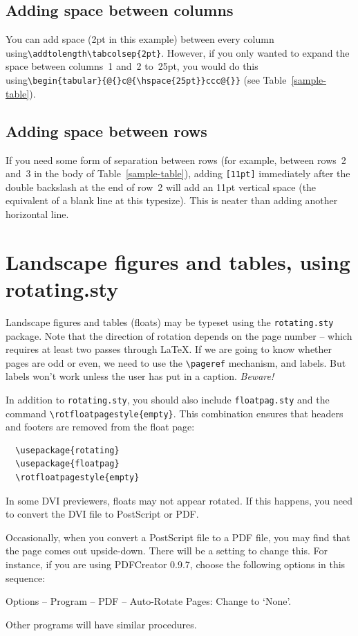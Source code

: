 \subsection{Adding space between columns}
\label{addhoriz}
You can add space (2pt in this example) between every column using\linebreak \verb"\addtolength\tabcolsep{2pt}". However, if you only wanted to expand the space \hbox{between} columns~1 and~2 to~25pt, you would do this using\linebreak   \verb"\begin{tabular}{@{}c@{\hspace{25pt}}ccc@{}}" (see Table~\ref{sample-table}).

\subsection{Adding space between rows}
If you need some form of separation between rows (for example, between rows~2 and~3 in the body of Table~\ref{sample-table}), adding \verb"[11pt]" immediately after the double backslash at the end of row~2 will add an 11pt vertical space (the equivalent of a blank line at this typesize). This is neater than adding another horizontal line.


\section{Landscape figures and tables, using rotating.sty}

Landscape figures and tables (floats) may be typeset using the \verb"rotating.sty" package. Note that the direction of rotation depends on the page number -- which requires at least two passes through \LaTeX. If we are going to know whether pages are odd or even, we need to use the \verb"\pageref" mechanism, and labels. But labels won't work unless the user has put in a caption. \textit{Beware!}

In addition to \verb"rotating.sty", you should also include \verb"floatpag.sty" and the command \verb"\rotfloatpagestyle{empty}". This combination ensures that headers and footers are removed from the float page:
\begin{verbatim}
  \usepackage{rotating}
  \usepackage{floatpag}
  \rotfloatpagestyle{empty}
\end{verbatim}
In some DVI previewers, floats may not appear rotated. If this happens, you need to convert the DVI file to PostScript or PDF.

Occasionally, when you convert a PostScript file to a PDF file, you may find that the page comes out upside-down. There will be a setting to change this. For instance, if you are using PDFCreator 0.9.7, choose the following options in this sequence:
\begin{description}
  \item Options -- Program -- PDF -- Auto-Rotate Pages: Change to `None'.
\end{description}
Other programs will have similar procedures.

